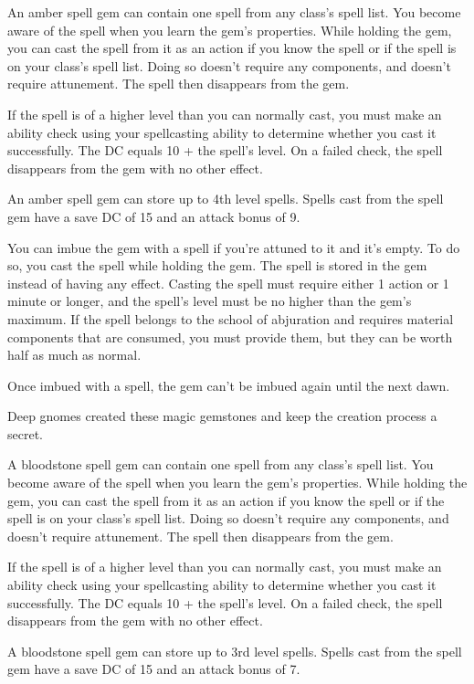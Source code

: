 \documentclass[10pt,a4paper,twoside,bg=print,twocolumn,openany,nodeprecatedcode]{dndbook}
\begin{document}
An amber spell gem can contain one spell from any class's spell list. You become aware of the spell when you learn the gem's properties. While holding the gem, you can cast the spell from it as an action if you know the spell or if the spell is on your class's spell list. Doing so doesn't require any components, and doesn't require attunement. The spell then disappears from the gem.

If the spell is of a higher level than you can normally cast, you must make an ability check using your spellcasting ability to determine whether you cast it successfully. The DC equals 10 + the spell's level. On a failed check, the spell disappears from the gem with no other effect.

An amber spell gem can store up to 4th level spells. Spells cast from the spell gem have a save DC of 15 and an attack bonus of 9.

You can imbue the gem with a spell if you're attuned to it and it's empty. To do so, you cast the spell while holding the gem. The spell is stored in the gem instead of having any effect. Casting the spell must require either 1 action or 1 minute or longer, and the spell's level must be no higher than the gem's maximum. If the spell belongs to the school of abjuration and requires material components that are consumed, you must provide them, but they can be worth half as much as normal.

Once imbued with a spell, the gem can't be imbued again until the next dawn.

Deep gnomes created these magic gemstones and keep the creation process a secret.

A bloodstone spell gem can contain one spell from any class's spell list. You become aware of the spell when you learn the gem's properties. While holding the gem, you can cast the spell from it as an action if you know the spell or if the spell is on your class's spell list. Doing so doesn't require any components, and doesn't require attunement. The spell then disappears from the gem.

If the spell is of a higher level than you can normally cast, you must make an ability check using your spellcasting ability to determine whether you cast it successfully. The DC equals 10 + the spell's level. On a failed check, the spell disappears from the gem with no other effect.

A bloodstone spell gem can store up to 3rd level spells. Spells cast from the spell gem have a save DC of 15 and an attack bonus of 7.
\end{document}
